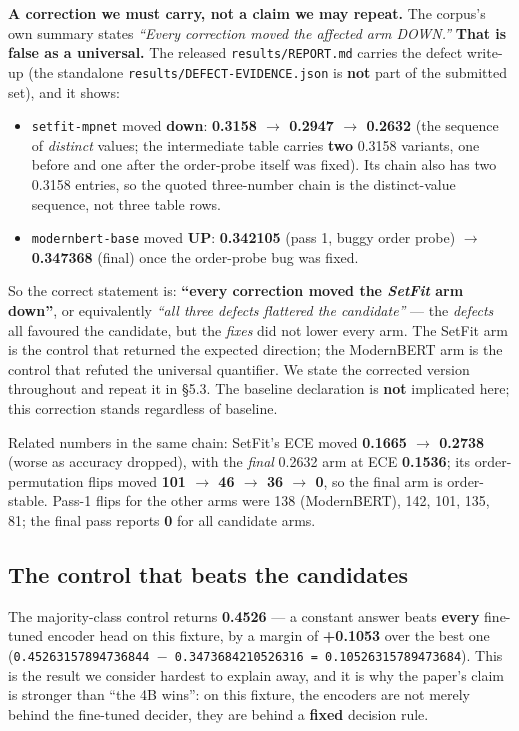 \documentclass[10pt]{article}
\begin{document}
\textbf{A correction we must carry, not a claim we may repeat.} The corpus's own summary states \emph{``Every correction moved the affected arm DOWN.''} \textbf{That is false as a universal.} The released \texttt{results/REPORT.md} carries the defect write-up (the standalone \texttt{results/DEFECT-EVIDENCE.json} is \textbf{not} part of the submitted set), and it shows:

\begin{itemize}
\item \texttt{setfit-mpnet} moved \textbf{down}: \textbf{0.3158 $\to$ 0.2947 $\to$ 0.2632} (the sequence of \emph{distinct} values; the intermediate table carries \textbf{two} 0.3158 variants, one before and one after the order-probe itself was fixed). Its chain also has two 0.3158 entries, so the quoted three-number chain is the distinct-value sequence, not three table rows.
\item \texttt{modernbert-base} moved \textbf{UP}: \textbf{0.342105} (pass 1, buggy order probe) $\to$ \textbf{0.347368} (final) once the order-probe bug was fixed.
\end{itemize}

So the correct statement is: \textbf{``every correction moved the \emph{SetFit} arm down''}, or equivalently \emph{``all three defects flattered the candidate''} --- the \emph{defects} all favoured the candidate, but the \emph{fixes} did not lower every arm. The SetFit arm is the control that returned the expected direction; the ModernBERT arm is the control that refuted the universal quantifier. We state the corrected version throughout and repeat it in \S5.3. The baseline declaration is \textbf{not} implicated here; this correction stands regardless of baseline.

Related numbers in the same chain: SetFit's ECE moved \textbf{0.1665 $\to$ 0.2738} (worse as accuracy dropped), with the \emph{final} 0.2632 arm at ECE \textbf{0.1536}; its order-permutation flips moved \textbf{101 $\to$ 46 $\to$ 36 $\to$ 0}, so the final arm is order-stable. Pass-1 flips for the other arms were 138 (ModernBERT), 142, 101, 135, 81; the final pass reports \textbf{0} for all candidate arms.

\subsection{The control that beats the candidates}

The majority-class control returns \textbf{0.4526} --- a constant answer beats \textbf{every} fine-tuned encoder head on this fixture, by a margin of \textbf{+0.1053} over the best one (\texttt{0.45263157894736844 $-$ 0.3473684210526316 = 0.10526315789473684}). This is the result we consider hardest to explain away, and it is why the paper's claim is stronger than ``the 4B wins'': on this fixture, the encoders are not merely behind the fine-tuned decider, they are behind a \textbf{fixed} decision rule.
\end{document}
